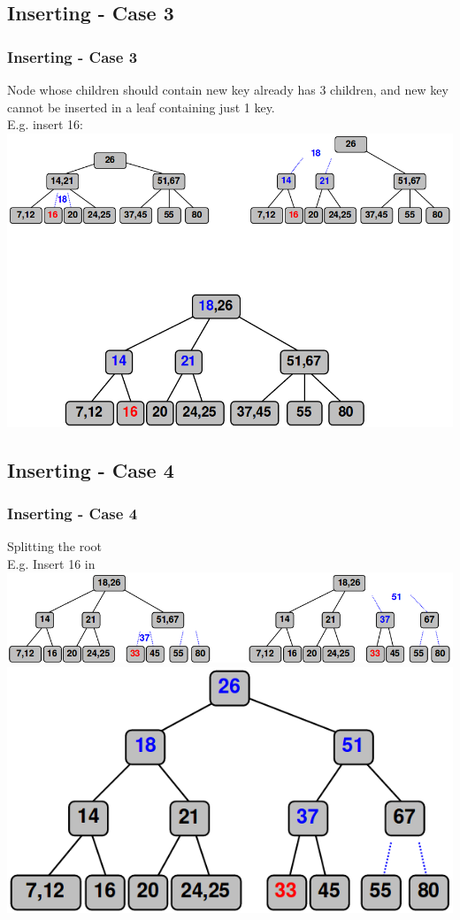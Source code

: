 \documentclass{beamer}
\begin{document}
\subsection{Inserting - Case 3}
\begin{frame}
\frametitle{Inserting - Case 3}
Node whose children should contain new key already has 3 children, and new key cannot be inserted in a leaf containing just 1 key.\\
E.g. insert 16:\\
\includegraphics[scale=0.3]{case3.png}
\end{frame}
\subsection{Inserting - Case 4}
\begin{frame}
\frametitle{Inserting - Case 4}
Splitting the root\\
E.g. Insert 16 in\\
\includegraphics[scale=0.3]{case4-1.png}\\
\includegraphics[scale=0.3]{case4-2.png}
\end{frame}
\end{document}
